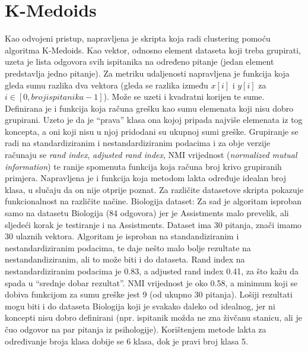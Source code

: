 \documentclass[times, utf8,projekt]{fer}
\begin{document}
\section{K-Medoids}
Kao odvojeni pristup, napravljena je skripta koja radi clustering pomoću algoritma K-Medoids.\newline
Kao vektor, odnosno element dataseta koji treba grupirati, uzeta je lista odgovora svih ispitanika na određeno pitanje (jedan element predstavlja jedno pitanje). Za metriku udaljenosti napravljena je funkcija koja gleda sumu razlika dva vektora (gleda se razlika između $x[i]$ i $y[i]$ za $i \in [0, broj ispitanika-1]$). Može se uzeti i kvadratni korijen te sume.\newline
Definirana je i funkcija koja računa grešku kao sumu elemenata koji nisu dobro grupirani. Uzeto je da je “prava” klasa ona kojoj pripada najviše elemenata iz tog koncepta, a oni koji nisu u njoj pridodani su ukupnoj sumi greške. 
Grupiranje se radi na standardiziranim i nestandardiziranim podacima i za obje verzije računaju se \textit{rand index}, \textit{adjusted rand index}, NMI vrijednost (\textit{normalized mutual information}) te ranije spomenuta funkcija koja računa broj krivo grupiranih primjera.\newline
Napravljena je i funkcija koja metodom lakta određuje idealan broj klasa, u slučaju da on nije otprije poznat.
\newline
\newline
Za različite datasetove skripta pokazuje funkcionalnost na različite načine.\newline
Biologija dataset:\newline
Za sad je algoritam isproban samo na datasetu Biologija (84 odgovora) jer je Assistments malo prevelik, ali sljedeći korak je testiranje i na Assistments.\newline
Dataset ima 30 pitanja, znači imamo 30 ulaznih vektora. Algoritam je isproban na standandiziranim i nestandardiziranim podacima, te daje nešto malo bolje rezultate na nestandandiziranim, ali to može biti i do dataseta. 
Rand index na nestandardiziranim podacima je 0.83, a adjusted rand index 0.41, za što kažu da spada u “srednje dobar rezultat”. NMI vrijednost je oko 0.58, a minimum koji se dobiva funkcijom za sumu greške jest 9 (od ukupno 30 pitanja). Lošiji rezultati mogu biti i do dataseta Biologija koji je svakako daleko od idealnog, jer ni koncepti nisu dobro definirani (npr. ispitanik možda ne zna živčanu stanicu, ali je čuo odgovor na par pitanja iz psihologije). 
Korištenjem metode lakta za određivanje broja klasa dobije se 6 klasa, dok je pravi broj klasa 5.\newline
\end{document}
